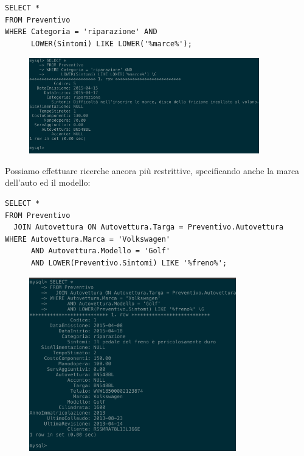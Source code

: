 \begin{description}
              \begin{lstlisting}
SELECT *
FROM Preventivo
WHERE Categoria = 'riparazione' AND
      LOWER(Sintomi) LIKE LOWER('%marce%');
              \end{lstlisting}

              \begin{figure}[H]
                \centering
                \includegraphics[width=10cm]{images/screenshots/search_preventivi_2.png}
              \end{figure}

            Possiamo effettuare ricerche ancora più restrittive, specificando anche la marca dell'auto ed il modello:

              \begin{lstlisting}
SELECT *
FROM Preventivo
  JOIN Autovettura ON Autovettura.Targa = Preventivo.Autovettura
WHERE Autovettura.Marca = 'Volkswagen'
      AND Autovettura.Modello = 'Golf'
      AND LOWER(Preventivo.Sintomi) LIKE '%freno%';
              \end{lstlisting}

              \begin{figure}[H]
                \centering
                \includegraphics[width=9cm]{images/screenshots/search_preventivi_3.png}
              \end{figure}


\end{description}
